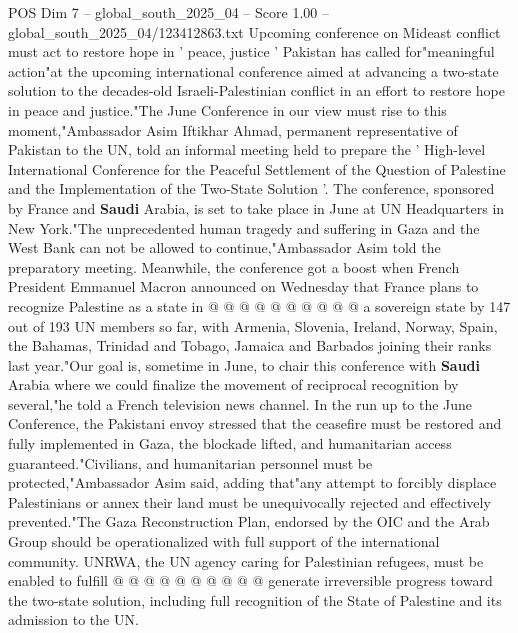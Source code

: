 \begin{textsample}{POS Dim 7 – global\_south\_2025\_04 – Score 1.00 – global\_south\_2025\_04/123412863.txt}  \label{ex:f7_pos_145}
Upcoming conference on Mideast conflict must act to restore hope in ' peace, justice ' Pakistan has called for"meaningful action"at the upcoming international conference aimed at advancing a two-state solution to the decades-old Israeli-Palestinian conflict in an effort to restore hope in peace and justice."The June Conference in our view must rise to this moment,"Ambassador Asim Iftikhar Ahmad, permanent representative of Pakistan to the UN, told an informal meeting held to prepare the ' High-level International Conference for the Peaceful Settlement of the Question of Palestine and the Implementation of the Two-State Solution '.
The conference, sponsored by France and \textbf{Saudi} Arabia, is set to take place in June at UN Headquarters in New York."The unprecedented human tragedy and suffering in Gaza and the West Bank can not be allowed to continue,"Ambassador Asim told the preparatory meeting.
Meanwhile, the conference got a boost when French President Emmanuel Macron announced on Wednesday that France plans to recognize Palestine as a state in @ @ @ @ @ @ @ @ @ @ a sovereign state by 147 out of 193 UN members so far, with Armenia, Slovenia, Ireland, Norway, Spain, the Bahamas, Trinidad and Tobago, Jamaica and Barbados joining their ranks last year."Our goal is, sometime in June, to chair this conference with \textbf{Saudi} Arabia where we could finalize the movement of reciprocal recognition by several,"he told a French television news channel.
In the run up to the June Conference, the Pakistani envoy stressed that the ceasefire must be restored and fully implemented in Gaza, the blockade lifted, and humanitarian access guaranteed."Civilians, and humanitarian personnel must be protected,"Ambassador Asim said, adding that"any attempt to forcibly displace Palestinians or annex their land must be unequivocally rejected and effectively prevented."The Gaza Reconstruction Plan, endorsed by the OIC and the Arab Group should be operationalized with full support of the international community.
UNRWA, the UN agency caring for Palestinian refugees, must be enabled to fulfill @ @ @ @ @ @ @ @ @ @ generate irreversible progress toward the two-state solution, including full recognition of the State of Palestine and its admission to the UN.

\end{textsample}
